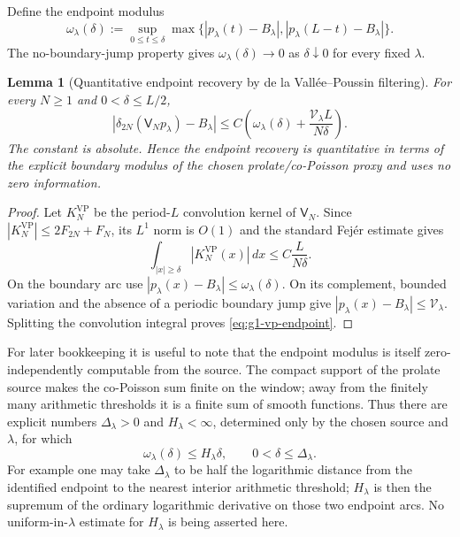 \documentclass[11pt]{article}
\newtheorem{lemma}[theorem]{Lemma}
\theoremstyle{remark}
\begin{document}
Define the endpoint modulus
\begin{equation}\label{eq:g1-edge-modulus}
 \omega_\lambda(\delta)
 :=\sup_{0\le t\le\delta}
 \max\{|p_\lambda(t)-B_\lambda|,
       |p_\lambda(L-t)-B_\lambda|\}.
\end{equation}
The no-boundary-jump property gives $\omega_\lambda(\delta)\to0$ as
$\delta\downarrow0$ for every fixed $\lambda$.

\begin{lemma}[Quantitative endpoint recovery by de la Vall\'ee--Poussin filtering]\label{lem:g1-vp-endpoint}
For every $N\ge1$ and $0<\delta\le L/2$,
\begin{equation}\label{eq:g1-vp-endpoint}
 \boxed{
 |\delta_{2N}(\mathsf V_Np_\lambda)-B_\lambda|
 \le C\left(
  \omega_\lambda(\delta)
  +\frac{\mathcal V_\lambda L}{N\delta}
 \right).}
\end{equation}
The constant is absolute.  Hence the endpoint recovery is quantitative in
terms of the explicit boundary modulus of the chosen prolate/co-Poisson
proxy and uses no zero information.
\end{lemma}
\begin{proof}
Let $K_N^{\mathrm{VP}}$ be the period-$L$ convolution kernel of
$\mathsf V_N$.  Since
$|K_N^{\mathrm{VP}}|\le2F_{2N}+F_N$, its $L^1$ norm is $O(1)$ and the
standard Fej\'er estimate gives
\[
 \int_{|x|\ge\delta}|K_N^{\mathrm{VP}}(x)|\,dx
 \le C\frac{L}{N\delta}.
\]
On the boundary arc use
$|p_\lambda(x)-B_\lambda|\le\omega_\lambda(\delta)$.  On its complement,
bounded variation and the absence of a periodic boundary jump give
$|p_\lambda(x)-B_\lambda|\le\mathcal V_\lambda$.  Splitting the convolution
integral proves \eqref{eq:g1-vp-endpoint}.
\end{proof}

For later bookkeeping it is useful to note that the endpoint modulus is itself
zero-independently computable from the source.  The compact support of the
prolate source makes the co-Poisson sum finite on the window; away from the
finitely many arithmetic thresholds it is a finite sum of smooth functions.
Thus there are explicit numbers $\Delta_\lambda>0$ and $H_\lambda<\infty$,
determined only by the chosen source and $\lambda$, for which
\begin{equation}\label{eq:g1-edge-lipschitz}
 \omega_\lambda(\delta)\le H_\lambda\delta,
 \qquad0<\delta\le\Delta_\lambda.
\end{equation}
For example one may take $\Delta_\lambda$ to be half the logarithmic distance
from the identified endpoint to the nearest interior arithmetic threshold;
$H_\lambda$ is then the supremum of the ordinary logarithmic derivative on
those two endpoint arcs.  No uniform-in-$\lambda$ estimate for $H_\lambda$ is
being asserted here.
\end{document}
